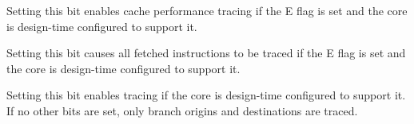 \implementation{}

Setting this bit enables cache performance tracing if the E flag is set and the 
core is design-time configured to support it.

\implementation{}

Setting this bit causes all fetched instructions to be traced if the E flag is 
set and the core is design-time configured to support it.

\implementation{}

Setting this bit enables tracing if the core is design-time configured to 
support it. If no other bits are set, only branch origins and destinations are 
traced.

\implementation{}

